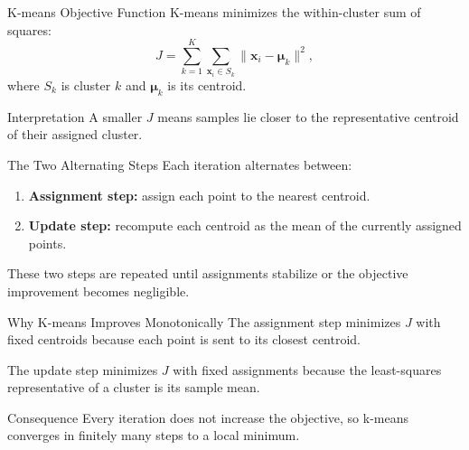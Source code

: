 \documentclass[12pt]{beamer}
\begin{document}
\begin{frame}{K-means Objective Function}
  \justifying
  K-means minimizes the within-cluster sum of squares:
  \[
    J = \sum_{k=1}^{K} \sum_{\mathbf{x}_i \in S_k} \lVert \mathbf{x}_i - \boldsymbol{\mu}_k \rVert^2,
  \]
  where $S_k$ is cluster $k$ and $\boldsymbol{\mu}_k$ is its centroid.

  \begin{conceptbox}{Interpretation}
    A smaller $J$ means samples lie closer to the representative centroid of their assigned cluster.
  \end{conceptbox}
\end{frame}

\begin{frame}{The Two Alternating Steps}
  \justifying
  Each iteration alternates between:
  \begin{enumerate}
    \item \textbf{Assignment step:} assign each point to the nearest centroid.
    \item \textbf{Update step:} recompute each centroid as the mean of the currently assigned points.
  \end{enumerate}

  These two steps are repeated until assignments stabilize or the objective improvement becomes negligible.
\end{frame}

\begin{frame}{Why K-means Improves Monotonically}
  \justifying
  The assignment step minimizes $J$ with fixed centroids because each point is sent to its closest centroid.

  The update step minimizes $J$ with fixed assignments because the least-squares representative of a cluster is its sample mean.

  \begin{conceptbox}{Consequence}
    Every iteration does not increase the objective, so k-means converges in finitely many steps to a local minimum.
  \end{conceptbox}
\end{frame}
\end{document}
